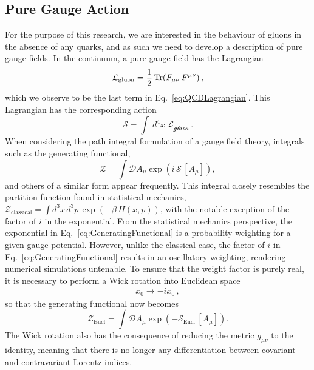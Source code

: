 \subsection{Pure Gauge Action}
For the purpose of this research, we are interested in the behaviour of gluons in the absence of any quarks, and as such we need to develop a description of pure gauge fields. In the continuum, a pure gauge field has the Lagrangian~\cite{ryder1996quantum}
%
\begin{equation}
\mathcal{L}_{\text{gluon}}=\frac{1}{2}\operatorname{Tr}(F_{\mu\nu}\,F^{\mu\nu})\, ,
\label{eq:GaugeLagrangian}
\end{equation}
%
which we observe to be the last term in Eq.~\ref{eq:QCDLagrangian}. This Lagrangian has the corresponding action
%
\begin{equation}
\mathcal{S}=\int~d^4x~\mathcal{L_\text{gluon}}\, .
\label{eq:QCDAction}
\end{equation}
%
When considering the path integral formulation of a gauge field theory, integrals such as the generating functional,
%
\begin{equation}
\mathcal{Z} =\int \mathcal{D} A_\mu \exp\left(i\,\mathcal{S}\,[A_\mu]\right),
\label{eq:GeneratingFunctional}
\end{equation}
%
and others of a similar form appear frequently. This integral closely resembles the partition function found in statistical mechanics, $\mathcal{Z}_{\text{classical}}=\int d^3x\,d^3p\,\exp\left(-\beta\,H(x,p)\right)$, with the notable exception of the factor of $i$ in the exponential. From the statistical mechanics perspective, the exponential in Eq.~\ref{eq:GeneratingFunctional} is a probability weighting for a given gauge potential. However, unlike the classical case, the factor of $i$ in Eq.~\ref{eq:GeneratingFunctional} results in an oscillatory weighting, rendering numerical simulations untenable. To ensure that the weight factor is purely real, it is necessary to perform a Wick rotation into Euclidean space~\cite{Schafer:1996wv,Wilson:1974sk}
%
\begin{align*}
x_0\rightarrow -ix_0\, ,
\end{align*}
%
so that the generating functional now becomes 
%
\begin{equation}
\mathcal{Z}_{\text{Eucl}} =\int \mathcal{D} A_\mu \exp\left(-\mathcal{S}_{\text{Eucl}}\,[A_\mu]\right).
\end{equation}
%
The Wick rotation also has the consequence of reducing the metric $g_{\mu\nu}$ to the identity, meaning that there is no longer any differentiation between covariant and contravariant Lorentz indices.\\

